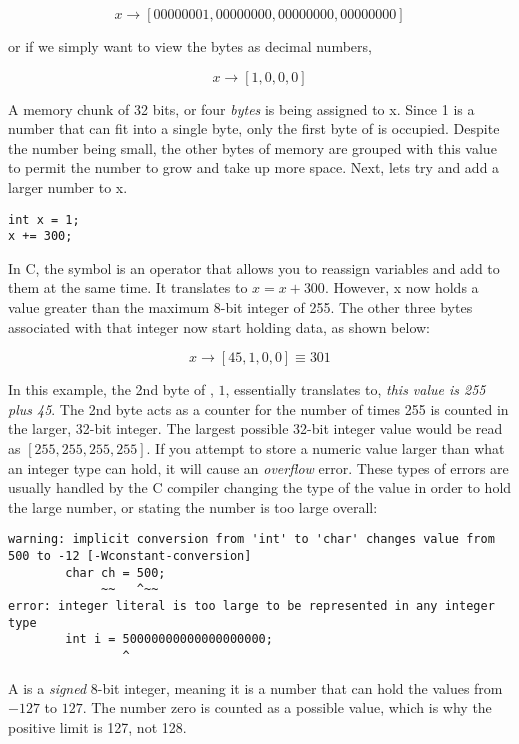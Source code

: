 $$
x \longrightarrow [00000001, 00000000, 00000000, 00000000]
$$

or if we simply want to view the bytes as decimal numbers,

$$
x \longrightarrow [1, 0, 0, 0]
$$

A memory chunk of 32 bits, or four \textit{bytes} is being assigned to x. Since 1 is a number that can fit into a single byte, only the first byte of  is occupied. Despite the number being small, the other bytes of memory are grouped with this value to permit the number to grow and take up more space. Next, lets try and add a larger number to x.

\begin{lstlisting}[style=customc]
int x = 1;
x += 300;
\end{lstlisting}

In C, the \codeword{+=} symbol is an operator that allows you to reassign variables and add to them at the same time. It translates to $x = x + 300$. However, x now holds a value greater than the maximum 8-bit integer of 255. The other three bytes associated with that integer now start holding data, as shown below:

$$
x  \longrightarrow [45, 1, 0, 0] \equiv 301
$$

In this example, the 2nd byte of , $1$, essentially translates to, \emph{this value is 255 plus 45}. The 2nd byte acts as a counter for the number of times 255 is counted in the larger, 32-bit integer. The largest possible 32-bit integer value would be read as $[255, 255, 255, 255]$. If you attempt to store a numeric value larger than what an integer type can hold, it will cause an \emph{overflow} error. These types of errors are usually handled by the C compiler changing the type of the value in order to hold the large number, or stating the number is too large overall:

\begin{lstlisting}[style=customc]
warning: implicit conversion from 'int' to 'char' changes value from 500 to -12 [-Wconstant-conversion]
        char ch = 500;
             ~~   ^~~
error: integer literal is too large to be represented in any integer type
        int i = 50000000000000000000;
                ^
\end{lstlisting}

A  is a \emph{signed} 8-bit integer, meaning it is a number that can hold the values from $-127$ to $127$. The number zero is counted as a possible value, which is why the positive limit is 127, not 128.

